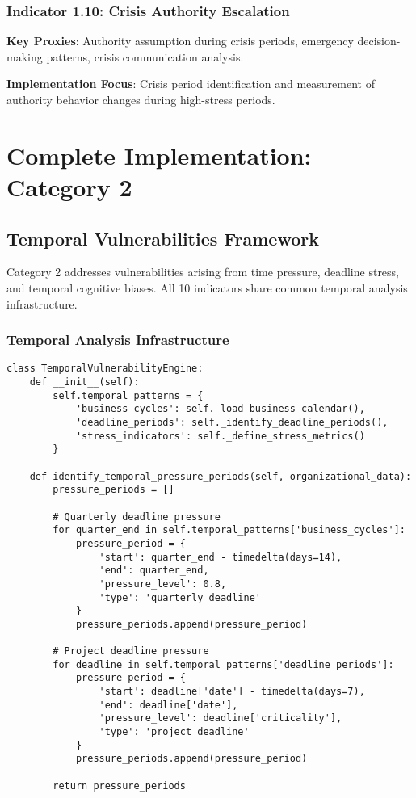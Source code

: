 \documentclass[11pt, onecolumn]{article}
\begin{document}
\subsubsection{Indicator 1.10: Crisis Authority Escalation}

\textbf{Key Proxies}: Authority assumption during crisis periods, emergency decision-making patterns, crisis communication analysis.

\textbf{Implementation Focus}: Crisis period identification and measurement of authority behavior changes during high-stress periods.

\section{Complete Implementation: Category 2}

\subsection{Temporal Vulnerabilities Framework}

Category 2 addresses vulnerabilities arising from time pressure, deadline stress, and temporal cognitive biases. All 10 indicators share common temporal analysis infrastructure.

\subsubsection{Temporal Analysis Infrastructure}

\begin{lstlisting}
class TemporalVulnerabilityEngine:
    def __init__(self):
        self.temporal_patterns = {
            'business_cycles': self._load_business_calendar(),
            'deadline_periods': self._identify_deadline_periods(),
            'stress_indicators': self._define_stress_metrics()
        }
        
    def identify_temporal_pressure_periods(self, organizational_data):
        pressure_periods = []
        
        # Quarterly deadline pressure
        for quarter_end in self.temporal_patterns['business_cycles']:
            pressure_period = {
                'start': quarter_end - timedelta(days=14),
                'end': quarter_end,
                'pressure_level': 0.8,
                'type': 'quarterly_deadline'
            }
            pressure_periods.append(pressure_period)
        
        # Project deadline pressure
        for deadline in self.temporal_patterns['deadline_periods']:
            pressure_period = {
                'start': deadline['date'] - timedelta(days=7),
                'end': deadline['date'],
                'pressure_level': deadline['criticality'],
                'type': 'project_deadline'
            }
            pressure_periods.append(pressure_period)
        
        return pressure_periods
\end{lstlisting}
\end{document}
